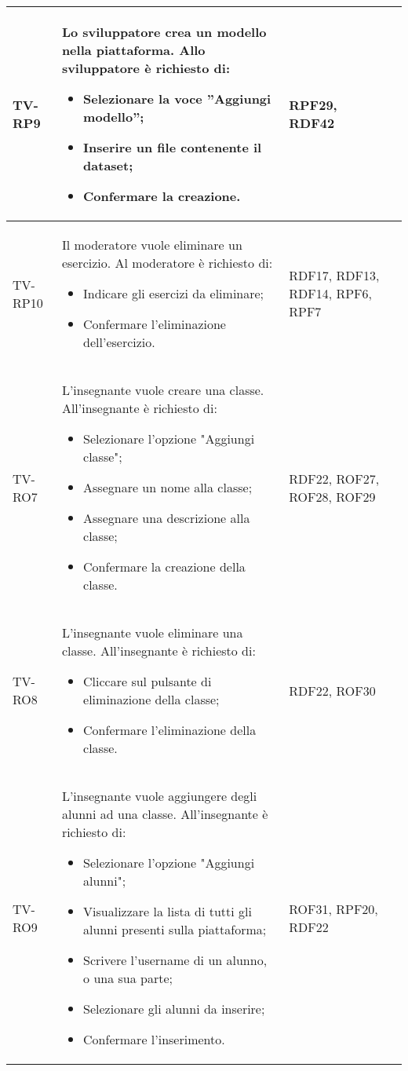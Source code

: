 \begin{longtable}{|>{\centering\arraybackslash}m{1.6cm}|>{\centering\arraybackslash}m{6.41cm}|>{\centering\arraybackslash}m{3.1cm} | >{\centering\arraybackslash}m{2.6cm}|}
		TV-RP9 & Lo sviluppatore crea un modello nella piattaforma. Allo sviluppatore è richiesto di:
\begin{itemize}
 \item Selezionare la voce ”Aggiungi modello”;
 \item Inserire un file contenente il dataset;
 \item Confermare la creazione.
\end{itemize}  & RPF29, RDF42 \\ \hline

		  \rowcolor{LightGray}
TV-RP10 & Il moderatore vuole eliminare un esercizio. Al moderatore è richiesto di:
\begin{itemize}
 \item Indicare gli esercizi da eliminare;
 \item Confermare l'eliminazione dell'esercizio.
\end{itemize}  & RDF17, RDF13, RDF14, RPF6, RPF7 \\ \hline

TV-RO7 & L'insegnante vuole creare una classe. All'insegnante è richiesto di:
\begin{itemize}
 \item Selezionare l'opzione "Aggiungi classe";
 \item Assegnare un nome alla classe;
 \item Assegnare una descrizione alla classe;
 \item Confermare la creazione della classe.
\end{itemize}  & RDF22, ROF27, ROF28, ROF29 \\ \hline

		  \rowcolor{LightGray}
TV-RO8 & L'insegnante vuole eliminare una classe. All'insegnante è richiesto di:
\begin{itemize}
 \item Cliccare sul pulsante di eliminazione della classe;
 \item Confermare l'eliminazione della classe.
\end{itemize}  & RDF22, ROF30 \\ \hline

TV-RO9 & L'insegnante vuole aggiungere degli alunni ad una classe. All'insegnante è richiesto di:
\begin{itemize}
 \item Selezionare l'opzione "Aggiungi alunni";
 \item Visualizzare la lista di tutti gli alunni presenti sulla piattaforma;
 \item Scrivere l'username di un alunno, o una sua parte;
 \item Selezionare gli alunni da inserire;
 \item Confermare l'inserimento.
\end{itemize}  & ROF31, RPF20, RDF22  \\ \hline


\end{longtable}
